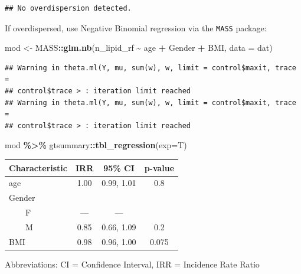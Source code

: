\documentclass[
]{book}
\newenvironment{Shaded}{\begin{snugshade}}{\end{snugshade}}
\newcommand{\AttributeTok}[1]{\textcolor[rgb]{0.13,0.29,0.53}{#1}}
\newcommand{\FunctionTok}[1]{\textcolor[rgb]{0.13,0.29,0.53}{\textbf{#1}}}
\newcommand{\NormalTok}[1]{#1}
\newcommand{\OtherTok}[1]{\textcolor[rgb]{0.56,0.35,0.01}{#1}}
\newcommand{\SpecialCharTok}[1]{\textcolor[rgb]{0.81,0.36,0.00}{\textbf{#1}}}
\begin{document}
\begin{verbatim}
## No overdispersion detected.
\end{verbatim}

If overdispersed, use Negative Binomial regression via the \texttt{MASS} package:

\begin{Shaded}
\begin{Highlighting}[]
\NormalTok{mod }\OtherTok{\textless{}{-}}\NormalTok{ MASS}\SpecialCharTok{::}\FunctionTok{glm.nb}\NormalTok{(n\_lipid\_rf }\SpecialCharTok{\textasciitilde{}}\NormalTok{ age }\SpecialCharTok{+}\NormalTok{ Gender }\SpecialCharTok{+}\NormalTok{ BMI, }\AttributeTok{data =}\NormalTok{ dat)}
\end{Highlighting}
\end{Shaded}

\begin{verbatim}
## Warning in theta.ml(Y, mu, sum(w), w, limit = control$maxit, trace =
## control$trace > : iteration limit reached
## Warning in theta.ml(Y, mu, sum(w), w, limit = control$maxit, trace =
## control$trace > : iteration limit reached
\end{verbatim}

\begin{Shaded}
\begin{Highlighting}[]
\NormalTok{mod }\SpecialCharTok{\%\textgreater{}\%}\NormalTok{ gtsummary}\SpecialCharTok{::}\FunctionTok{tbl\_regression}\NormalTok{(}\AttributeTok{exp=}\NormalTok{T)}
\end{Highlighting}
\end{Shaded}

\begin{table}[t]
\fontsize{12.0pt}{14.0pt}\selectfont
\begin{tabular*}{\linewidth}{@{\extracolsep{\fill}}lccc}
\toprule
\textbf{Characteristic} & \textbf{IRR} & \textbf{95\% CI} & \textbf{p-value} \\ 
\midrule\addlinespace[2.5pt]
age & 1.00 & 0.99, 1.01 & 0.8 \\ 
Gender &  &  &  \\ 
    F & — & — &  \\ 
    M & 0.85 & 0.66, 1.09 & 0.2 \\ 
BMI & 0.98 & 0.96, 1.00 & 0.075 \\ 
\bottomrule
\end{tabular*}
\begin{minipage}{\linewidth}
\vspace{.05em}
Abbreviations: CI = Confidence Interval, IRR = Incidence Rate Ratio\\
\end{minipage}
\end{table}
\end{document}
